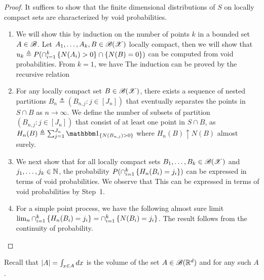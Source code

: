 \documentclass[letterpaper,10pt,english]{article}
\begin{document}
\begin{proof}
It suffices to show that the finite dimensional distributions of $S$ on locally compact sets are characterized by void probabilities. 
\begin{enumerate}
\item[\bf{Step 1:}]  
We will show this by induction on the number of points $k$ in a bounded set $A \in \mathscr{B}$. 
Let $A_1, \dots, A_k, B \in \mathscr{B}(\mathscr{X})$ locally compact, then we will show that $u_k \triangleq P(\cap_{i=1}^k\left\{N(A_i)> 0\right\}\cap\left\{N(B) = 0\right\})$ can be computed from void probabilities.
From $k=1$, we have 
The induction can be proved by the recursive relation 
\item[\bf{Step 2:}]  
For any locally compact set $B \in \mathscr{B}(\mathscr{X})$, there exists a sequence of nested partitions $B_n \triangleq (B_{n,j}: j \in [J_n])$ that eventually separates the points in $S\cap B$ as $n \to \infty$. 
We define the number of subsets of partition $(B_{n,j}: j \in [J_n])$ that consist of at least one point in $S\cap B$, as $H_n(B) \triangleq \sum_{j=1}^{J_n}\SetIn{N(B_{n,j}) > 0}$ where $H_n(B) \uparrow N(B)$ almost surely. 
\item[\bf{Step 3:}]  
We next show that for all locally compact sets $B_1, \dots, B_k \in \mathscr{B}(\mathscr{X})$ and $j_1, \dots, j_k \in \mathbb{N}$, 
the probability $P(\cap_{i=1}^k\left\{H_n(B_i) = j_i\right\})$ can be expressed in terms of void probabilities. 
We observe that 
This can be expressed in terms of void probabilities by Step~1. 
\item[\bf{Step 4:}] For a simple point process, we have the following almost sure limit $\lim_n\cap_{i=1}^k\left\{H_n(B_i) = j_i\right\} = \cap_{i=1}^k\left\{N(B_i) = j_i\right\}$. 
The result follows from the continuity of probability.
\end{enumerate}
\end{proof}
\begin{rem} 
Recall that $\left\lvert A\right\rvert = \int_{x \in A}dx$ is the volume of the set $A \in \mathscr{B}(\mathbb{R}^d)$ and for any such $A$.
\end{rem}
\end{document}
